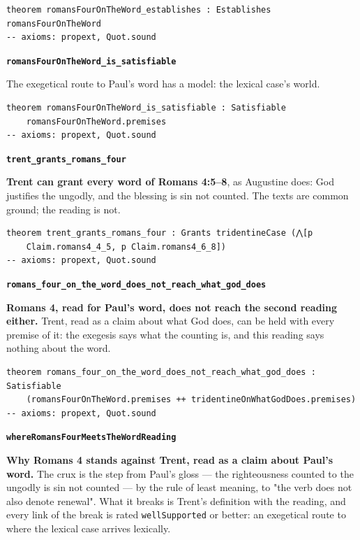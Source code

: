 \documentclass[11pt]{article}
\begin{document}
{\small\begin{verbatim}
theorem romansFourOnTheWord_establishes : Establishes romansFourOnTheWord
-- axioms: propext, Quot.sound
\end{verbatim}}
\par\medskip\noindent\textbf{\texttt{romans\allowbreak{}Four\allowbreak{}On\allowbreak{}The\allowbreak{}Word\_\allowbreak{}is\_\allowbreak{}satisfiable}}\par\nobreak\noindent
The exegetical route to Paul's word has a model: the lexical case's world.

{\small\begin{verbatim}
theorem romansFourOnTheWord_is_satisfiable : Satisfiable
    romansFourOnTheWord.premises
-- axioms: propext, Quot.sound
\end{verbatim}}
\par\medskip\noindent\textbf{\texttt{trent\_\allowbreak{}grants\_\allowbreak{}romans\_\allowbreak{}four}}\par\nobreak\noindent
\textbf{Trent can grant every word of Romans 4:5–8}, as Augustine does: God justifies the ungodly, and the blessing is sin not counted. The texts are common ground; the reading is not.

{\small\begin{verbatim}
theorem trent_grants_romans_four : Grants tridentineCase (⋀[p
    Claim.romans4_4_5, p Claim.romans4_6_8])
-- axioms: propext, Quot.sound
\end{verbatim}}
\par\medskip\noindent\textbf{\texttt{romans\_\allowbreak{}four\_\allowbreak{}on\_\allowbreak{}the\_\allowbreak{}word\_\allowbreak{}does\_\allowbreak{}not\_\allowbreak{}reach\_\allowbreak{}what\_\allowbreak{}god\_\allowbreak{}does}}\par\nobreak\noindent
\textbf{Romans 4, read for Paul's word, does not reach the second reading either.} Trent, read as a claim about what God does, can be held with every premise of it: the exegesis says what the counting is, and this reading says nothing about the word.

{\small\begin{verbatim}
theorem romans_four_on_the_word_does_not_reach_what_god_does : Satisfiable
    (romansFourOnTheWord.premises ++ tridentineOnWhatGodDoes.premises)
-- axioms: propext, Quot.sound
\end{verbatim}}
\par\medskip\noindent\textbf{\texttt{where\allowbreak{}Romans\allowbreak{}Four\allowbreak{}Meets\allowbreak{}The\allowbreak{}Word\allowbreak{}Reading}}\par\nobreak\noindent
\textbf{Why Romans 4 stands against Trent, read as a claim about Paul's word.} The crux is the step from Paul's gloss — the righteousness counted to the ungodly is sin not counted — by the rule of least meaning, to "the verb does not also denote renewal". What it breaks is Trent's definition with the reading, and every link of the break is rated \texttt{well\allowbreak{}Supported} or better: an exegetical route to where the lexical case arrives lexically.
\end{document}

